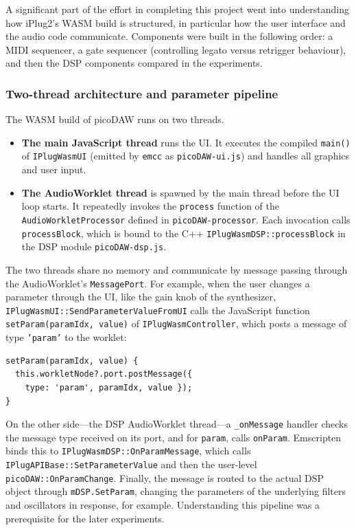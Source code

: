 A significant part of the effort in completing this project went into understanding how iPlug2's WASM build is structured, in particular how the user interface and the audio code communicate. Components were built in the following order: a MIDI sequencer, a gate sequencer (controlling legato versus retrigger behaviour), and then the DSP components compared in the experiments.

\subsubsection{Two-thread architecture and parameter pipeline}
\label{sec:threads}
\noindent
The WASM build of picoDAW runs on two threads.
\begin{itemize}
  \item \textbf{The main JavaScript thread} runs the UI. It executes the compiled \texttt{main()} of \texttt{IPlugWasmUI} (emitted by \texttt{emcc} as \texttt{picoDAW-ui.js}) and handles all graphics and user input.
  \item \textbf{The AudioWorklet thread} is spawned by the main thread before the UI loop starts. It repeatedly invokes the \texttt{process} function of the \texttt{AudioWorkletProcessor} defined in \texttt{picoDAW-processor}. Each invocation calls \texttt{processBlock}, which is bound to the C++ \texttt{IPlugWasmDSP::processBlock} in the DSP module \texttt{picoDAW-dsp.js}.
\end{itemize}

The two threads share no memory and communicate by message passing through the AudioWorklet's \texttt{MessagePort}. For example, when the user changes a parameter through the UI, like the gain knob of the synthesizer, \texttt{IPlugWasmUI::SendParameterValueFromUI} calls the JavaScript function \texttt{setParam(paramIdx, value)} of \texttt{IPlugWasmController}, which posts a message of type \texttt{'param'} to the worklet:

\begin{verbatim}
setParam(paramIdx, value) {
  this.workletNode?.port.postMessage({
    type: 'param', paramIdx, value });
}
\end{verbatim}

On the other side---the DSP AudioWorklet thread---a \texttt{\_onMessage} handler checks the message type received on its port, and for \texttt{param}, calls \texttt{onParam}. Emscripten binds this to \texttt{IPlugWasmDSP::OnParamMessage}, which calls \texttt{IPlugAPIBase::SetParameterValue} and then the user-level \texttt{picoDAW::OnParamChange}. Finally, the message is routed to the actual DSP object through \texttt{mDSP.SetParam}, changing the parameters of the underlying filters and oscillators in response, for example.
Understanding this pipeline was a prerequisite for the later experiments. 


